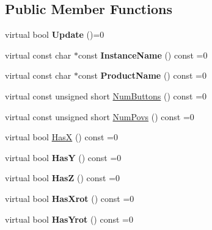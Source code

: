 \subsection*{Public Member Functions}
\begin{DoxyCompactItemize}
\item 
\mbox{\label{struct_x_input_joypad_a7119f927f05cfbeb65e3383fd81a1e1f}} 
virtual bool {\bfseries Update} ()=0
\item 
\mbox{\label{struct_x_input_joypad_a93c04a58a50c4c3b18d37d0716d526d6}} 
virtual const char $\ast$const {\bfseries Instance\+Name} () const =0
\item 
\mbox{\label{struct_x_input_joypad_a7c56d532ce6a437a4caeca48c7daa466}} 
virtual const char $\ast$const {\bfseries Product\+Name} () const =0
\item 
virtual const unsigned short \hyperlink{struct_x_input_joypad_a9bc1d9930ca27e815b05542a7fd38a39}{Num\+Buttons} () const =0
\item 
virtual const unsigned short \hyperlink{struct_x_input_joypad_a715b4a23b83fa39ca3940f4e2f45c852}{Num\+Povs} () const =0
\item 
virtual bool \hyperlink{struct_x_input_joypad_a9b5317808345c53bc0df5a3054dd0318}{HasX} () const =0
\item 
\mbox{\label{struct_x_input_joypad_adc9941ccb63f0970f5a2224fb44fdcd0}} 
virtual bool {\bfseries HasY} () const =0
\item 
\mbox{\label{struct_x_input_joypad_af740d5b0bce33c49c4a4cb062d7df070}} 
virtual bool {\bfseries HasZ} () const =0
\item 
\mbox{\label{struct_x_input_joypad_af87200b7a9aa629bc3bca3376d125e73}} 
virtual bool {\bfseries Has\+Xrot} () const =0
\item 
\mbox{\label{struct_x_input_joypad_a4a4f86be4f9cb79b5b6ae53fd07378b1}} 
virtual bool {\bfseries Has\+Yrot} () const =0
\item 
\mbox{\label{struct_x_input_joypad_a9d061e6be6ba35fbdb29a6ba11699184}} 

\end{DoxyCompactItemize}
